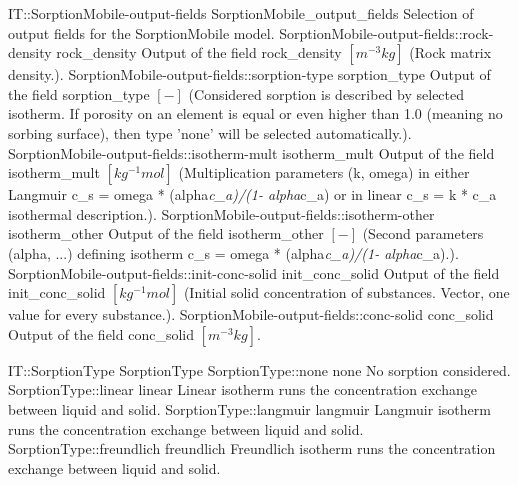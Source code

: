 \begin{SelectionType}
	{IT::SorptionMobile-output-fields}
	{SorptionMobile{\_}output{\_}fields}
	{{{Selection of output fields for the SorptionMobile model.}}}
		\SelectionItem
			{SorptionMobile-output-fields::rock-density}
			{rock{\_}density}
			{{{Output of the field rock{\_}density }{$[m^{-3}kg]$}{ (Rock matrix density.).}}}
		\SelectionItem
			{SorptionMobile-output-fields::sorption-type}
			{sorption{\_}type}
			{{{Output of the field sorption{\_}type }{$[-]$}{ (Considered sorption is described by selected isotherm. If porosity on an element is equal or even higher than 1.0 (meaning no sorbing surface), then type 'none' will be selected automatically.).}}}
		\SelectionItem
			{SorptionMobile-output-fields::isotherm-mult}
			{isotherm{\_}mult}
			{{{Output of the field isotherm{\_}mult }{$[kg^{-1}mol]$}{ (Multiplication parameters (k, omega) in either Langmuir c{\_}s = omega * (alpha}\textit{c{\_}a)/(1- alpha}{c{\_}a) or in linear c{\_}s = k * c{\_}a isothermal description.).}}}
		\SelectionItem
			{SorptionMobile-output-fields::isotherm-other}
			{isotherm{\_}other}
			{{{Output of the field isotherm{\_}other }{$[-]$}{ (Second parameters (alpha, ...) defining isotherm  c{\_}s = omega * (alpha}\textit{c{\_}a)/(1- alpha}{c{\_}a).).}}}
		\SelectionItem
			{SorptionMobile-output-fields::init-conc-solid}
			{init{\_}conc{\_}solid}
			{{{Output of the field init{\_}conc{\_}solid }{$[kg^{-1}mol]$}{ (Initial solid concentration of substances. Vector, one value for every substance.).}}}
		\SelectionItem
			{SorptionMobile-output-fields::conc-solid}
			{conc{\_}solid}
			{{{Output of the field conc{\_}solid }{$[m^{-3}kg]$}{.}}}
\end{SelectionType}
\begin{SelectionType}
	{IT::SorptionType}
	{SorptionType}
	{}
		\SelectionItem
			{SorptionType::none}
			{none}
			{{{No sorption considered.}}}
		\SelectionItem
			{SorptionType::linear}
			{linear}
			{{{Linear isotherm runs the concentration exchange between liquid and solid.}}}
		\SelectionItem
			{SorptionType::langmuir}
			{langmuir}
			{{{Langmuir isotherm runs the concentration exchange between liquid and solid.}}}
		\SelectionItem
			{SorptionType::freundlich}
			{freundlich}
			{{{Freundlich isotherm runs the concentration exchange between liquid and solid.}}}
\end{SelectionType}
